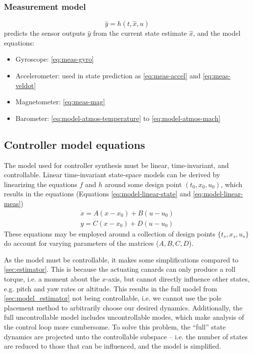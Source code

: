 \subsubsection{Measurement model} 
\begin{equation}
    \hat y = h(t, \hat x, u) \nonumber
\end{equation}
predicts the sensor outputs $\hat y$ from the current state estimate $\hat x$, and the model equations:
\begin{itemize}
    \item Gyroscope: \ref{eq:meas-gyro}
    \item Accelerometer: used in state prediction as \ref{eq:meas-accel} and \ref{eq:meas-veldot}
    \item Magnetometer: \ref{eq:meas-mag}
    \item Barometer: \ref{eq:model-atmos-temperature} to \ref{eq:model-atmos-mach}
\end{itemize}

\subsection{Controller model equations}
\label{sec:model_controller}
The model used for controller synthesis must be linear, time-invariant, and controllable.
Linear time-invariant state-space models can be derived by linearizing the equations $f$ and $h$ around some design point $(t_0, x_0, u_0)$, which results in the equations (Equations \ref{eq:model-linear-state} and \ref{eq:model-linear-meas})
\begin{align}
    \dot x = A (x-x_0) + B (u-u_0) \nonumber \\
    y = C (x-x_0) + D (u-u_0) \nonumber
\end{align}
These equations may be employed around a collection of design points $\{ t_s, x_s, u_s \}$ do account for varying parameters of the matrices ($A,B,C,D$).

As the model must be controllable, it makes some simplifications compared to \autoref{sec:estimator}.
This is because the actuating canards can only produce a roll torque, i.e. a moment about the $x$-axis, but cannot directly influence other states, e.g. pitch and yaw rates or altitude.
This results in the full model from \autoref{sec:model_estimator} not being controllable, i.e. we cannot use the pole placement method to arbitrarily choose our desired dynamics.
Additionally, the full uncontrollable model includes uncontrollable modes, which make analysis of the control loop more cumbersome. 
To solve this problem, the ``full'' state dynamics are projected unto the controllable subspace -- i.e. the number of states are reduced to those that can be influenced, and the model is simplified.  


